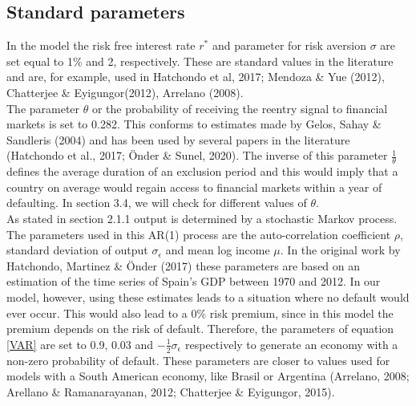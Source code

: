 \subsection{Standard parameters}
In the model the risk free interest rate $r^*$ and parameter for risk aversion $\sigma$ are set equal to 1\% and 2, respectively. These are standard values in the literature and are, for example, used in Hatchondo et al, 2017; Mendoza \& Yue (2012), Chatterjee \& Eyigungor(2012), Arrelano (2008).\\

The parameter $\theta$ or the probability of receiving the reentry signal to financial markets is set to 0.282. This conforms to estimates made by Gelos, Sahay \& Sandleris (2004) and has been used by several papers in the literature (Hatchondo et al., 2017; Önder \& Sunel, 2020). The inverse of this parameter $\frac{1}{\theta}$ defines the average duration of an exclusion period and this would imply that a country on average would regain access to financial markets within a year of defaulting. In section 3.4, we will check for different values of $\theta$.\\

As stated in section 2.1.1 output is determined by a stochastic Markov process. The parameters used in this AR(1) process are the auto-correlation coefficient $\rho$, standard deviation of output $\sigma_\epsilon$ and mean log income $\mu$. In the original work by Hatchondo, Martinez \& Önder (2017) these parameters are based on an estimation of the time series of Spain's GDP between 1970 and 2012. In our model, however, using these estimates leads to a situation where no default would ever occur. This would also lead to a 0\% risk premium, since in this model the premium depends on the risk of default. Therefore, the parameters of equation \eqref{VAR} are set to 0.9, 0.03 and $-\frac{1}{2}\sigma_\epsilon$ respectively to generate an economy with a non-zero probability of default. These parameters are closer to values used for models with a South American economy, like Brasil or Argentina (Arrelano, 2008; Arellano \& Ramanarayanan, 2012; Chatterjee \& Eyigungor, 2015).\\

